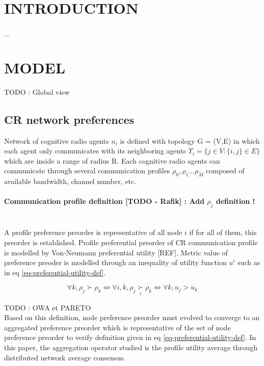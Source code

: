 \documentclass[10pt,twocolumn]{article}
\newcommand{\preferal}[1]{\underset{#1}{\succ}}
\begin{document}
\section{INTRODUCTION}

\newpage
_
\newpage
\section{MODEL}

TODO : Global view \\

\subsection{CR network preferences}

Network of cognitive radio agents $n_i$ is defined with topology G = (V,E) in which each agent only communicates with its neighboring agents $\Upsilon_i = \{j \in V : \{i,j\} \in E\}$ which are inside a range of radius R. Each cognitive radio agents can communicate through several communication profiles $\rho_0, \rho_1 ... \rho_M$ composed of available bandwidth, channel number, etc.

\paragraph*{Communication profile definition [TODO - Rafik] : Add $\rho_j$ definition !}\\

A profile preference preorder is representative of all node $i$ if for all of them, this preorder is established. Profile preferential preorder of CR communication profile is modelled by Von-Neumann preferential utility [REF].  Metric value of preference preoder is modelled through an inequality of utility function $u^i$ such as in eq \ref{eq-preferential-utility-def}.  

\begin{equation}
\label{eq-preferential-utility-def}
\displaystyle
\forall k, \rho_j \succ \rho_k \Longleftrightarrow \forall i,k,  \rho_j \preferal{i} \rho_k \Longleftrightarrow \forall k, u_j > u_k
\end{equation}

TODO : OWA et PARETO\\

Based on this definition, node preference preorder must evolved to converge to an aggregated preference preorder which is representative of the set of node preference preorder to verify definition given in eq \ref{eq-preferential-utility-def}. In this paper, the aggregation operator studied is the profile utility average through distributed network average consensus.
\end{document}

